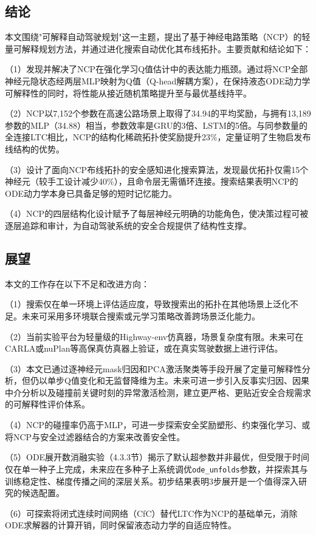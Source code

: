 \xiaosi

\subsection{结论}

本文围绕"可解释自动驾驶规划"这一主题，提出了基于神经电路策略（NCP）的轻量可解释规划方法，并通过进化搜索自动优化其布线拓扑。主要贡献和结论如下：

（1）发现并解决了NCP在强化学习Q值估计中的表达能力瓶颈。通过将NCP全部神经元隐状态经两层MLP映射为Q值（Q-head解耦方案），在保持液态ODE动力学可解释性的同时，将性能从接近随机策略提升至与最优基线持平。

（2）NCP以7,152个参数在高速公路场景上取得了34.94的平均奖励，与拥有13,189参数的MLP（34.88）相当，参数效率是GRU的3倍、LSTM的5倍。与同参数量的全连接LTC相比，NCP的结构化稀疏拓扑使奖励提升23\%，定量证明了生物启发布线结构的优势。

（3）设计了面向NCP布线拓扑的安全感知进化搜索算法，发现最优拓扑仅需15个神经元（较手工设计减少40\%），且命令层无需循环连接。搜索结果表明NCP的ODE动力学本身已具备足够的短时记忆能力。

（4）NCP的四层结构化设计赋予了每层神经元明确的功能角色，使决策过程可被逐层追踪和审计，为自动驾驶系统的安全合规提供了结构性支撑。

\subsection{展望}

本文的工作存在以下不足和改进方向：

（1）搜索仅在单一环境上评估适应度，导致搜索出的拓扑在其他场景上泛化不足。未来可采用多环境联合搜索或元学习策略改善跨场景泛化能力。

（2）当前实验平台为轻量级的Highway-env仿真器，场景复杂度有限。未来可在CARLA或nuPlan等高保真仿真器上验证，或在真实驾驶数据上进行评估。

（3）本文已通过逐神经元mask归因和PCA激活聚类等手段开展了定量可解释性分析，但仍以单步Q值变化和无监督降维为主。未来可进一步引入反事实归因、因果中介分析以及碰撞前关键时刻的异常激活检测，建立更严格、更贴近安全合规需求的可解释性评价体系。

（4）NCP的碰撞率仍高于MLP，可进一步探索安全奖励塑形、约束强化学习、或将NCP与安全过滤器结合的方案来改善安全性。

（5）ODE展开数消融实验（4.3.3节）揭示了默认超参数并非最优，但受限于时间仅在单一种子上完成，未来应在多种子上系统调优\texttt{ode\_unfolds}参数，并探索其与训练稳定性、梯度传播之间的深层关系。初步结果表明3步展开是一个值得深入研究的候选配置。

（6）可探索将闭式连续时间网络（CfC）替代LTC作为NCP的基础单元，消除ODE求解器的计算开销，同时保留液态动力学的自适应特性。

